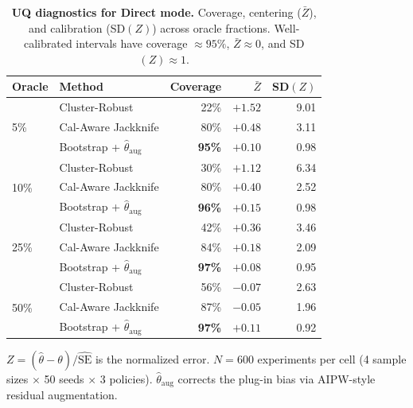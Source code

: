 \begin{table}[t]
\centering
\caption{\textbf{UQ diagnostics for Direct mode.} Coverage, centering ($\bar{Z}$), and calibration (SD$(Z)$) across oracle fractions. Well-calibrated intervals have coverage $\approx 95\%$, $\bar{Z} \approx 0$, and SD$(Z) \approx 1$.}
\label{tab:uq-diagnostics}
\small
\begin{tabular}{@{}llrrr@{}}
\toprule
\textbf{Oracle} & \textbf{Method} & \textbf{Coverage} & \textbf{$\bar{Z}$} & \textbf{SD$(Z)$} \\
\midrule
\multirow{3}{*}{5\%}
& Cluster-Robust & 22\% & $+1.52$ & 9.01 \\
& Cal-Aware Jackknife & 80\% & $+0.48$ & 3.11 \\
& Bootstrap + $\hat\theta_{\mathrm{aug}}$ & \textbf{95\%} & $+0.10$ & 0.98 \\
\midrule
\multirow{3}{*}{10\%}
& Cluster-Robust & 30\% & $+1.12$ & 6.34 \\
& Cal-Aware Jackknife & 80\% & $+0.40$ & 2.52 \\
& Bootstrap + $\hat\theta_{\mathrm{aug}}$ & \textbf{96\%} & $+0.15$ & 0.98 \\
\midrule
\multirow{3}{*}{25\%}
& Cluster-Robust & 42\% & $+0.36$ & 3.46 \\
& Cal-Aware Jackknife & 84\% & $+0.18$ & 2.09 \\
& Bootstrap + $\hat\theta_{\mathrm{aug}}$ & \textbf{97\%} & $+0.08$ & 0.95 \\
\midrule
\multirow{3}{*}{50\%}
& Cluster-Robust & 56\% & $-0.07$ & 2.63 \\
& Cal-Aware Jackknife & 87\% & $-0.05$ & 1.96 \\
& Bootstrap + $\hat\theta_{\mathrm{aug}}$ & \textbf{97\%} & $+0.11$ & 0.92 \\
\bottomrule
\end{tabular}
\vspace{1mm}

\footnotesize{
$Z = (\hat\theta - \theta) / \widehat{\mathrm{SE}}$ is the normalized error.
$N{=}600$ experiments per cell (4 sample sizes $\times$ 50 seeds $\times$ 3 policies).
$\hat\theta_{\mathrm{aug}}$ corrects the plug-in bias via AIPW-style residual augmentation.
}
\end{table}
